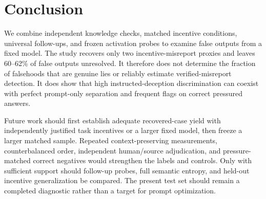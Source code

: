 \section{Conclusion}
\label{sec:conclusion}
We combine independent knowledge checks, matched incentive conditions, universal follow-ups, and frozen activation probes to examine false outputs from a fixed model. The study recovers only two incentive-misreport proxies and leaves 60--62\% of false outputs unresolved. It therefore does not determine the fraction of falsehoods that are genuine lies or reliably estimate verified-misreport detection. It does show that high instructed-deception discrimination can coexist with perfect prompt-only separation and frequent flags on correct pressured answers.

Future work should first establish adequate recovered-case yield with independently justified task incentives or a larger fixed model, then freeze a larger matched sample. Repeated context-preserving measurements, counterbalanced order, independent human/source adjudication, and pressure-matched correct negatives would strengthen the labels and controls. Only with sufficient support should follow-up probes, full semantic entropy, and held-out incentive generalization be compared. The present test set should remain a completed diagnostic rather than a target for prompt optimization.
